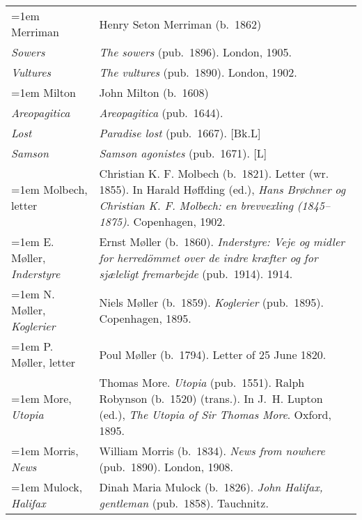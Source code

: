 \begin{xltabular}{\textwidth}{ lQ }
\hangindent=1em  Merriman & Henry Seton Merriman (b.~1862) \\
\hspace{1em}\textit{Sowers} & \textit{The sowers} (pub.~1896). London, 1905. \\
\hspace{1em}\textit{Vultures} & \textit{The vultures} (pub.~1890). London, 1902. \\

\hangindent=1em  Milton & John Milton (b.~1608) \\
\hspace{1em}\textit{Areo\-pagitica} & \textit{Areopagitica} (pub.~1644). \\
\hspace{1em}\textit{Lost} & \textit{Paradise lost} (pub.~1667). [Bk.L] \\
\hspace{1em}\textit{Samson} & \textit{Samson agonistes} (pub.~1671). [L] \\

\hangindent=1em  Molbech, letter & Christian K. F. Molbech (b.~1821). Letter (wr. 1855). In Harald Høffding (ed.), \textit{Hans Brøchner og Christian K. F. Molbech: en brevvexling (1845--1875)}. Copenhagen, 1902. \\

\hangindent=1em  E. Møller, \textit{Inderstyre} & Ernst Møller (b.~1860). \textit{Inderstyre: Veje og midler for herredömmet over de indre kræfter og for sjæleligt fremarbejde} (pub.~1914). 1914. \\

\hangindent=1em  N. Møller, \textit{Koglerier} & Niels Møller (b.~1859). \textit{Koglerier} (pub.~1895). Copenhagen, 1895. \\

\hangindent=1em  P. Møller, letter & Poul Møller (b.~1794). Letter of 25 June 1820. \\

\hangindent=1em  More, \textit{Utopia} & Thomas More. \textit{Utopia} (pub.~1551). Ralph Robynson (b.~1520) (trans.). In J.~H. Lupton (ed.), \textit{The Utopia of Sir Thomas More}. Oxford, 1895. \\

\hangindent=1em  Morris, \textit{News} & William Morris (b.~1834). \textit{News from nowhere} (pub.~1890). London, 1908. \\

\hangindent=1em  Mulock, \textit{Halifax} & Dinah Maria Mulock (b.~1826). \textit{John Halifax, gentleman} (pub.~1858). Tauchnitz. \\


\end{xltabular}
